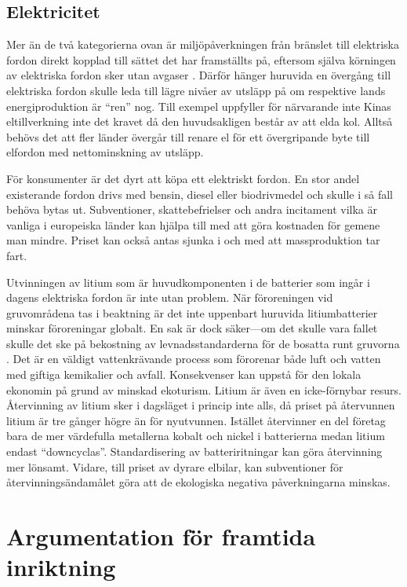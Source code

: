 \documentclass{article}
\begin{document}
\subsection{Elektricitet}

Mer än de två kategorierna ovan är miljöpåverkningen från bränslet till elektriska fordon
direkt kopplad till sättet det har framställts på,
eftersom själva körningen av elektriska fordon sker utan avgaser \autocite{persson18}.
Därför hänger huruvida en övergång till elektriska fordon skulle leda till
lägre nivåer av utsläpp på om respektive lands energiproduktion är ``ren'' nog.
Till exempel uppfyller för närvarande inte Kinas eltillverkning inte det kravet
då den huvudsakligen består av att elda kol.
Alltså behövs det att fler länder övergår till renare el för ett övergripande byte till elfordon
med nettominskning av utsläpp.

För konsumenter är det dyrt att köpa ett elektriskt fordon.
En stor andel existerande fordon drivs med bensin, diesel eller biodrivmedel
och skulle i så fall behöva bytas ut.
Subventioner, skattebefrielser och andra incitament vilka är vanliga i europeiska länder
kan hjälpa till med att göra kostnaden för gemene man mindre.
Priset kan också antas sjunka i och med att massproduktion tar fart.

Utvinningen av litium som är huvudkomponenten i de batterier som ingår i dagens elektriska fordon
är inte utan problem.
När föroreningen vid gruvområdena tas i beaktning är det inte uppenbart huruvida
litiumbatterier minskar föroreningar globalt.
En sak är dock säker---om det skulle vara fallet skulle det ske på bekostning
av levnadsstandarderna för de bosatta runt gruvorna \autocite{persson18}.
Det är en väldigt vattenkrävande process som förorenar både luft och vatten
med giftiga kemikalier och avfall.
Konsekvenser kan uppstå för den lokala ekonomin på grund av minskad ekoturism.
Litium är även en icke-förnybar resurs.
Återvinning av litium sker i dagsläget i princip inte alls,
då priset på återvunnen litium är tre gånger högre än för nyutvunnen.
Istället återvinner en del företag bara de mer värdefulla metallerna kobalt och nickel
i batterierna medan litium endast ``downcyclas''.
Standardisering av batteriritningar kan göra återvinning mer lönsamt.
Vidare, till priset av dyrare elbilar, kan subventioner för återvinningsändamålet
göra att de ekologiska negativa påverkningarna minskas.

\section{Argumentation för framtida inriktning}
\end{document}
